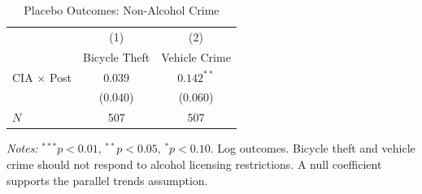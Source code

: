 \begin{table}[H]
\centering
\caption{Placebo Outcomes: Non-Alcohol Crime}
\label{tab:placebo}
\begin{threeparttable}
\begin{tabular}{lcc}
\toprule
 & (1) & (2) \\
 & Bicycle Theft & Vehicle Crime \\
\midrule
CIA $\times$ Post & $0.039$ & $0.142^{**}$ \\
 & (0.040) & (0.060) \\
$N$ & 507 & 507 \\
\bottomrule
\end{tabular}
\begin{tablenotes}[flushleft]
\footnotesize
\item \textit{Notes:} $^{***}p<0.01$, $^{**}p<0.05$, $^{*}p<0.10$. Log outcomes. Bicycle theft and vehicle crime should not respond to alcohol licensing restrictions. A null coefficient supports the parallel trends assumption.
\end{tablenotes}
\end{threeparttable}
\end{table}
